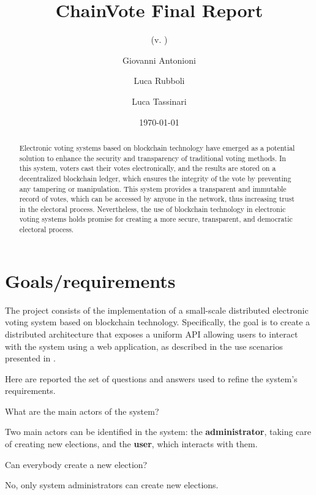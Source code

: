 \documentclass{scrartcl}
\title{\LARGE
    ChainVote Final Report
}
\subtitle{(v. \version)}
\author{
    Giovanni Antonioni \\ \emailaddr{giovanni.antonioni2@studio.unibo.it}
    \and 
    Luca Rubboli \\ \emailaddr{luca.rubboli2@studio.unibo.it} 
    \and 
    Luca Tassinari \\ \emailaddr{luca.tassinari10@studio.unibo.it}
}
\date{\today}
\begin{document}
\maketitle

\begin{abstract}
    Electronic voting systems based on blockchain technology have emerged as a potential solution to enhance the security and transparency of traditional voting methods. In this system, voters cast their votes electronically, and the results are stored on a decentralized blockchain ledger, which ensures the integrity of the vote by preventing any tampering or manipulation. This system provides a transparent and immutable record of votes, which can be accessed by anyone in the network, thus increasing trust in the electoral process. Nevertheless, the use of blockchain technology in electronic voting systems holds promise for creating a more secure, transparent, and democratic electoral process.
\end{abstract}

\section{Goals/requirements}

The project consists of the implementation of a small-scale distributed electronic voting system based on blockchain technology.
%
Specifically, the goal is to create a distributed architecture that exposes a uniform API allowing users to interact with the system using a web application, as described in the use scenarios presented in . 

Here are reported the set of questions and answers used to refine the system's requirements.

\begin{Question}
    What are the main actors of the system?
\end{Question}
\begin{Answer}
    Two main actors can be identified in the system: the \textbf{administrator}, taking care of creating new elections, and the \textbf{user}, which interacts with them.
\end{Answer}

\begin{Question}
    Can everybody create a new election?
\end{Question}
\begin{Answer}
    No, only system administrators can create new elections.
\end{Answer}
\end{document}
